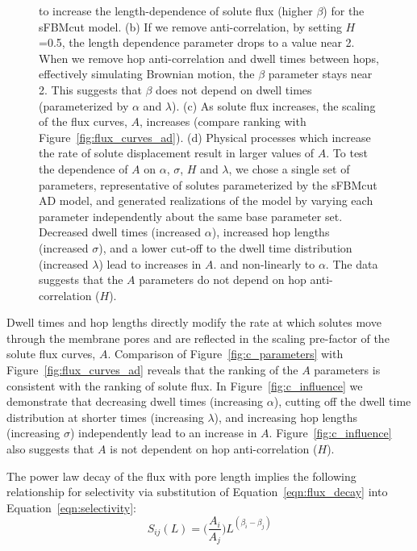 \documentclass[aps,pre,preprint,groupedaddress,longbibliography]{revtex4-2}
\begin{document}
\begin{figure}
{	  to increase the length-dependence of solute flux (higher $\beta$) for
	  the sFBMcut model.  (b) If we remove anti-correlation, by setting
	  $H$=0.5, the length dependence parameter drops to a value near 2.
	  When we remove hop anti-correlation and dwell times between hops,
	  effectively simulating Brownian motion, the $\beta$ parameter stays
	  near 2.  This suggests that $\beta$ does not depend on dwell times
	  (parameterized by $\alpha$ and $\lambda$). (c) As solute flux
	  increases, the scaling of the flux curves, $A$, increases (compare
	  ranking with Figure~\ref{fig:flux_curves_ad}).  (d) Physical
	  processes which increase the rate of solute displacement result in
	  larger values of $A$. To test the dependence of $A$ on $\alpha$,
	  $\sigma$, $H$ and $\lambda$, we chose a single set of parameters,
	  representative of solutes parameterized by the sFBMcut AD model, and
	  generated realizations of the model by varying each parameter
	  independently about the same base parameter set. 
	  Decreased dwell times (increased $\alpha$), increased hop lengths (increased
	  $\sigma$), and a lower cut-off to the dwell time distribution
	  (increased $\lambda$) lead to increases in $A$. 
	  and non-linearly to $\alpha$.  The data suggests that the $A$
	  parameters do not depend on hop anti-correlation ($H$).
 	  }\label{fig:beta}
  \end{figure}
    
  Dwell times and hop lengths directly modify the rate at which solutes move 
  through the membrane pores and are reflected in the scaling pre-factor of
  the solute flux curves, $A$. Comparison of Figure~\ref{fig:c_parameters} with 
  Figure~\ref{fig:flux_curves_ad} reveals that the ranking of the $A$ parameters
  is consistent with the ranking of solute flux. In Figure~\ref{fig:c_influence} we
  demonstrate that decreasing dwell times (increasing $\alpha$), cutting off 
  the dwell time distribution at shorter times (increasing $\lambda$), and increasing 
  hop lengths (increasing $\sigma$) independently lead to an increase in $A$. 
  Figure~\ref{fig:c_influence} also suggests that $A$ is not dependent on hop 
  anti-correlation ($H$).
  
  The power law decay of the flux with pore length implies the following
  relationship for selectivity via substitution of
  Equation~\ref{eqn:flux_decay} into Equation~\ref{eqn:selectivity}:
  \begin{equation}
  S_{ij}(L) = \bigg(\frac{A_i}{A_j}\bigg)L^{(\beta_i - \beta_j)}
  \label{eqn:selectivity_ratio}
  \end{equation}
\end{document}

